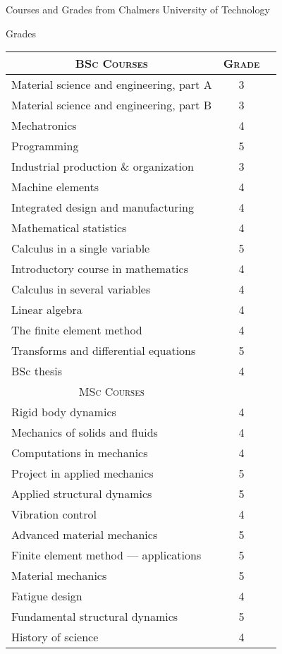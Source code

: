 \documentclass[a4paper,10pt]{article} %
\begin{document}
{%
\newpage
\par{
\centering\Large
\hypertarget{grds}{Courses and Grades from Chalmers University of Technology}\par}
\large{\centering Grades\par}\normalsize

\begin{center}
\begin{tabular}{lcc}

\multicolumn{1}{c}{\textsc{BSc Courses}} & \textsc{Grade}\\
\hline
Material science and engineering, part A  & 3\\
Material science and engineering, part B & 3\\
Mechatronics & 4\\
Programming & 5\\
Industrial production \& organization & 3\\
Machine elements & 4\\
Integrated design and manufacturing & 4\\
Mathematical statistics & 4\\
Calculus in a single variable & 5\\
Introductory course in mathematics & 4\\
Calculus in several variables & 4\\
Linear algebra & 4\\
The finite element method & 4\\
Transforms and differential equations & 5\\
BSc thesis & 4\\

\multicolumn{1}{c}{\textsc{MSc Courses}} & \\
\hline
Rigid body dynamics & 4\\
Mechanics of solids and fluids & 4\\
Computations in mechanics & 4\\
Project in applied mechanics & 5\\
Applied structural dynamics & 5\\
Vibration control & 4\\
Advanced material mechanics & 5\\
Finite element method --- applications & 5\\
Material mechanics & 5\\
Fatigue design & 4\\
Fundamental structural dynamics & 5\\
History of science & 4\\


\end{tabular}
\end{center}}
\end{document}
